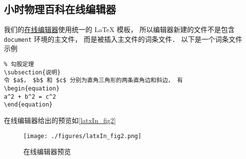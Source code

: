 \subsection{小时物理百科在线编辑器}

我们的\href{http://wuli.wiki}{在线编辑器}使用统一的 LaTeX 模板， 所以编辑器新建的文件不是包含 \lstinline|document| 环境的主文件， 而是被插入主文件的词条文件． 以下是一个词条文件示例

\begin{lstlisting}
% 勾股定理
\subsection{说明}
令 $a$， $b$ 和 $c$ 分别为直角三角形的两条直角边和斜边， 有
\begin{equation}
a^2 + b^2 = c^2
\end{equation}
\end{lstlisting}
在线编辑器给出的预览如\autoref{latxIn_fig2}
\begin{figure}[ht]
\centering
\texttt{[image: ./figures/latxIn\_fig2.png]}
\caption{在线编辑器预览} \label{latxIn_fig2}
\end{figure}


